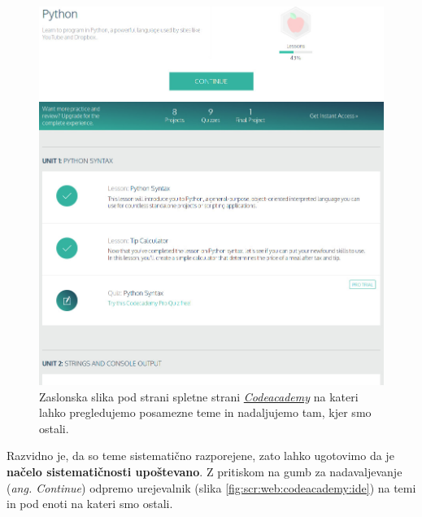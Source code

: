 
\begin{figure}[h!]
  \centering
    \includegraphics [width=0.65\linewidth, keepaspectratio =
    1] {./images/sc_web/codeacademy_tema_01.jpg}
%  
  \caption{Zaslonska slika pod strani spletne strani
      \emph{\href{https://www.codecademy.com/}{Codeacademy}}
      \cite{web:codeacademy} na kateri lahko pregledujemo posamezne
      teme in nadaljujemo tam, kjer smo ostali.}
    \label{fig:scr:web:codeacademy:tema}
\end{figure}

Razvidno je, da so teme sistematično razporejene, zato lahko ugotovimo
da je \textbf{načelo sistematičnosti upoštevano}. Z pritiskom na gumb
za nadavaljevanje (\emph{ang. Continue}) odpremo urejevalnik (slika
\ref{fig:scr:web:codeacademy:ide}) na temi in pod enoti na kateri smo
ostali.

